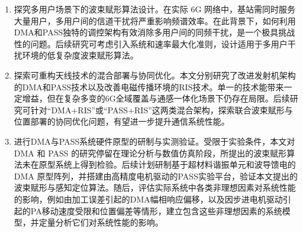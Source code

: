 \begin{enumerate}
	\item 探究多用户场景下的波束赋形算法设计。在实际 6G 网络中，基站需同时服务大量用户，多用户间的信道干扰将严重影响频谱效率。在此背景下，如何利用DMA和PASS独特的调控架构有效消除多用户间的同频干扰，是一个极具挑战性的问题。后续研究可考虑引入系统和速率最大化准则，设计适用于多用户干扰环境的低复杂度波束赋形算法。
	
	\item 探索可重构天线技术的混合部署与协同优化。本文分别研究了改进发射机架构的DMA和PASS技术以及改善电磁传播环境的RIS技术。单一的技术能带来一定增益，但在复杂多变的6G全域覆盖与通感一体化场景下仍存在局限。后续研究可针对“DMA+RIS”或“PASS+RIS”这两类混合架构，探索联合波束赋形与位置部署的协同优化问题，有望进一步提升通信系统性能。
	
	\item 进行DMA与PASS系统硬件原型的研制与实测验证。受限于实验条件，本文对 DMA 和 PASS 的研究停留在理论分析与数值仿真阶段，所提出的波束赋形算法未在原型系统上得到检验。后续计划研制基于超材料谐振单元和波导馈电的 DMA 原型阵列，并搭建由高精度电机驱动的PASS实验平台，验证本文提出的波束赋形与感知定位算法。随后，评估实际系统中各类非理想因素对系统性能的影响，例如由加工误差引起的DMA幅相响应偏移，以及因步进电机驱动引起的PA移动速度受限和位置偏差等情形，建立包含这些非理想因素的系统模型，并定量分析它们对系统性能的影响。
\end{enumerate}
